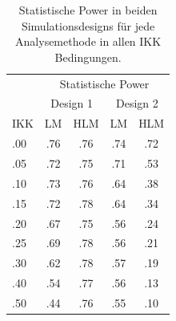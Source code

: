 \documentclass[12pt]{article}\usepackage[]{graphicx}\usepackage[]{color}
\begin{document}
\begin{table}[b!]
\centering
\setlength{\tabcolsep}{10pt}
\begin{threeparttable}
\caption{Statistische Power in beiden Simulationsdesigns für jede Analysemethode in allen IKK Bedingungen.}
\begin{tabular}{lcccc}
\toprule
	& \multicolumn{4}{c}{Statistische Power}\\
\cmidrule(lr){2-5}
	& \multicolumn{2}{c}{Design 1} & \multicolumn{2}{c}{Design 2} \\
\cmidrule(lr){2-3} \cmidrule(lr){4-5}
IKK & LM 	& HLM 	& LM 	& HLM \\ 
\midrule
.00 & .76 	& .76 	& .74 	& .72 \\ 
.05 & .72 	& .75 	& .71 	& .53 \\ 
.10 & .73 	& .76 	& .64 	& .38 \\ 
.15 & .72 	& .78 	& .64 	& .34 \\ 
.20 & .67 	& .75 	& .56 	& .24 \\ 
.25 & .69 	& .78 	& .56 	& .21 \\ 
.30 & .62 	& .78 	& .57 	& .19 \\ 
.40 & .54 	& .77 	& .56 	& .13 \\ 
.50 & .44 	& .76 	& .55 	& .10 \\ 
\bottomrule
\end{tabular}
\label{tab:power_study2}
\end{threeparttable}
\end{table}
\end{document}
